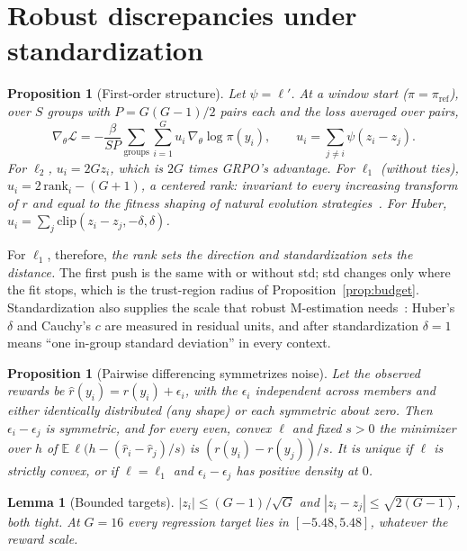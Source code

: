 \documentclass[11pt]{article}
\newtheorem{proposition}[theorem]{Proposition}
\newtheorem{lemma}[theorem]{Lemma}
\theoremstyle{definition}
\theoremstyle{remark}
\newcommand{\E}{\mathbb{E}}
\newcommand{\pref}{\pi_{\mathrm{ref}}}
\newcommand{\cL}{\mathcal{L}}
\newcommand{\1}{\mathbb{1}}
\begin{document}
\section{Robust discrepancies under standardization}\label{sec:robust}

\begin{proposition}[First-order structure]\label{prop:firstorder}
Let $\psi=\ell'$. At a window start ($\pi=\pref$), over $S$ groups with $P=G(G-1)/2$
pairs each and the loss averaged over pairs,
\[
  \nabla_\theta\cL=-\frac{\beta}{SP}\sum_{\text{groups}}\sum_{i=1}^G u_i\,\nabla_\theta\log\pi(y_i),
  \qquad u_i=\sum_{j\neq i}\psi(z_i-z_j).
\]
For $\ell_2$, $u_i=2Gz_i$, which is $2G$ times GRPO's advantage. For $\ell_1$ (without ties),
$u_i=2\,\mathrm{rank}_i-(G+1)$, a centered rank: invariant to every increasing
transform of $r$ and equal to the fitness shaping of natural evolution
strategies~\cite{nes}. For Huber, $u_i=\sum_j\mathrm{clip}(z_i-z_j,-\delta,\delta)$.
\end{proposition}

For $\ell_1$, therefore, \emph{the rank sets the direction and standardization sets
the distance.} The first push is the same with or without std; std changes only
where the fit stops, which is the trust-region radius of
Proposition~\ref{prop:budget}. Standardization also supplies the scale that robust
M-estimation needs~\cite{huber}: Huber's $\delta$ and Cauchy's $c$ are measured in
residual units, and after standardization $\delta=1$ means ``one in-group standard
deviation'' in every context.

\begin{proposition}[Pairwise differencing symmetrizes noise]\label{prop:symm}
Let the observed rewards be $\hat r(y_i)=r(y_i)+\epsilon_i$, with the $\epsilon_i$
independent across members and either identically distributed (any shape) or each
symmetric about zero. Then $\epsilon_i-\epsilon_j$ is symmetric, and for every even,
convex $\ell$ and fixed $s>0$ the minimizer over $h$ of
$\E\,\ell\bigl(h-(\hat r_i-\hat r_j)/s\bigr)$ is $(r(y_i)-r(y_j))/s$. It is unique if
$\ell$ is strictly convex, or if $\ell=\ell_1$ and $\epsilon_i-\epsilon_j$ has positive
density at $0$.
\end{proposition}

\begin{lemma}[Bounded targets]\label{lem:bounded}
$|z_i|\le(G-1)/\sqrt G$ and $|z_i-z_j|\le\sqrt{2(G-1)}$, both tight. At $G=16$ every
regression target lies in $[-5.48,5.48]$, whatever the reward scale.
\end{lemma}
\end{document}
